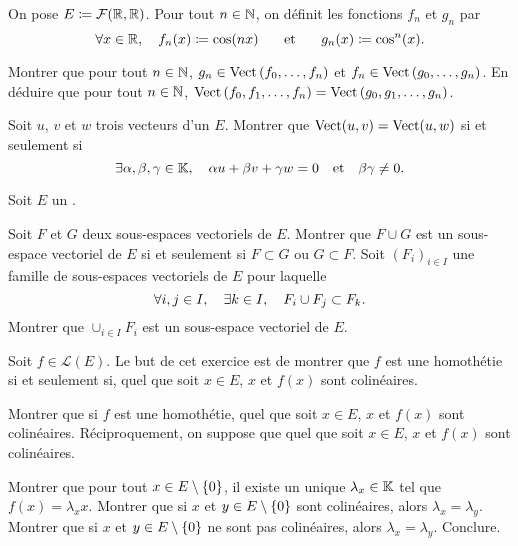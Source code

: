 \documentclass{magnolia}
\begin{document}
On pose $E\coloneqq\mathcal{F}(\mathbb{R},\mathbb{R})$. Pour tout $n\in\mathbb{N}$, on définit les fonctions
$f_n$ et $g_n$ par
\[\forall x\in\mathbb{R},\quad f_n(x)\coloneqq\cos(nx) \quad\quad\!\text{et}\quad\!\quad g_n(x)\coloneqq\cos^n(x).\]
\begin{questions}
\question Montrer que pour tout $n\in\mathbb{N}$, $g_n\in\operatorname{Vect}\left(f_0,\ldots,f_n\right)$ et
  $f_n\in\operatorname{Vect}\left(g_0,\ldots,g_n\right)$.
\question En déduire que pour tout $n\in\mathbb{N}$,
  $\operatorname{Vect}\left(f_0,f_1,\ldots,f_n\right)=\operatorname{Vect}\left(g_0,g_1,\ldots,g_n\right)$.
\end{questions} 

Soit $u$, $v$ et $w$ trois vecteurs d'un \Kev $E$. Montrer que $\operatorname{Vect} (u,v)=\operatorname{Vect} (u,w)$
si et seulement si
\[\exists \alpha,\beta,\gamma \in \mathbb{K} ,\quad \alpha u+\beta v+\gamma w=0 \quad
  \text{et} \quad \beta\gamma\not=0.\]

Soit $E$ un \Kev.
\begin{questions}
\question Soit $F$ et $G$ deux sous-espaces vectoriels de $E$. Montrer que $F\cup G$ est un sous-espace
  vectoriel de $E$ si et seulement si $F\subset G$ ou $G\subset F$.
\question Soit $(F_i)_{i\in I}$ une famille de sous-espaces vectoriels de $E$ pour laquelle
  \[\forall i,j\in I,\quad \exists k\in I,\quad F_i \cup F_j \subset F_k.\]
  Montrer que $\cup_{i\in I} F_i$ est un sous-espace vectoriel de $E$.
\end{questions}



Soit $f\in\mathcal{L}(E)$. Le but de cet exercice est de montrer que $f$ est une homothétie
si et seulement si, quel que soit $x\in E$, $x$ et $f(x)$ sont colinéaires.
\begin{questions}
\question Montrer que si $f$ est une homothétie, quel que soit $x\in E$, $x$ et $f(x)$ sont colinéaires.
\question Réciproquement, on suppose que quel que soit $x\in E$, $x$ et $f(x)$ sont colinéaires.
  \begin{questions}
  \question Montrer que pour tout $x\in E\setminus\left\{0\right\}$, il existe un unique $\lambda_x\in\mathbb{K}$ tel
    que $f(x)=\lambda_x x$.
  \question Montrer que si $x$ et $y\in E\setminus\left\{0\right\}$ sont colinéaires, alors $\lambda_x=\lambda_y$.
  \question Montrer que si $x$ et $y\in E\setminus\left\{0\right\}$ ne sont pas colinéaires, alors
    $\lambda_x=\lambda_y$.
  \question Conclure.
  \end{questions}
\end{questions}
\end{document}
